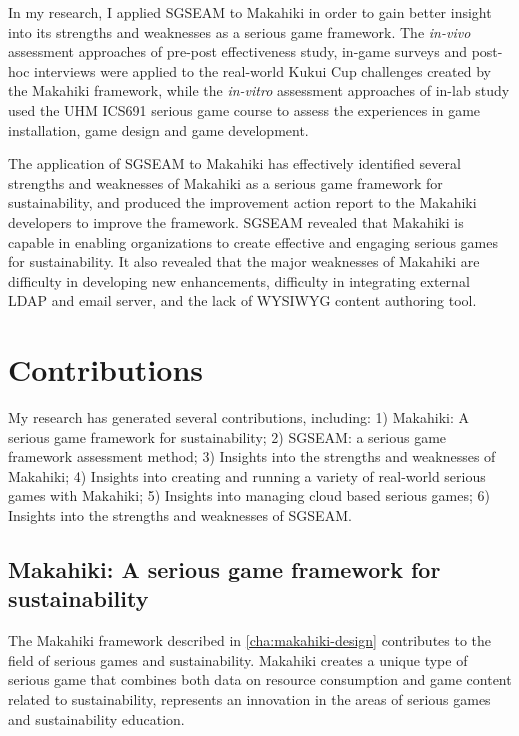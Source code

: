 In my research, I applied SGSEAM to Makahiki in order to gain better insight into its strengths and weaknesses as a serious game framework. The {\em in-vivo} assessment approaches of pre-post effectiveness study, in-game surveys and post-hoc interviews were applied to the real-world Kukui Cup challenges created by the Makahiki framework, while the {\em in-vitro} assessment approaches of in-lab study used the UHM ICS691 serious game course to assess the experiences in game installation, game design and game development. 

The application of SGSEAM to Makahiki has effectively identified several strengths and weaknesses of Makahiki as a serious game framework for sustainability, and produced the improvement action report to the Makahiki developers to improve the framework. SGSEAM revealed that Makahiki is capable in enabling organizations to create effective and engaging serious games for sustainability. It also revealed that the major weaknesses of Makahiki are difficulty in developing new enhancements,  difficulty in integrating external LDAP and email server, and the lack of WYSIWYG content authoring tool.

\section{Contributions}

My research has generated several contributions, including: 1) Makahiki: A serious game framework for sustainability; 2) SGSEAM: a serious game framework assessment method; 3) Insights into the strengths and weaknesses of Makahiki; 4) Insights into creating and running a variety of real-world serious games with Makahiki;  5) Insights into managing cloud based serious games;  6) Insights into the strengths and weaknesses of SGSEAM.

\subsection{Makahiki: A serious game framework for sustainability}

The Makahiki framework described in \autoref{cha:makahiki-design} contributes to the field of serious games
and sustainability. Makahiki creates a unique type of serious game that combines
both data on resource consumption and game content related to sustainability, represents an innovation in the areas of serious games and sustainability education. 

